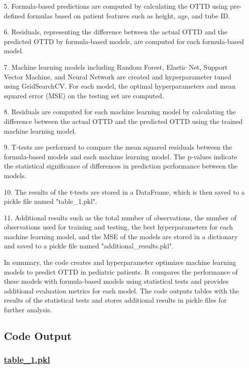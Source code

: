 \documentclass[11pt]{article}
\begin{document}
5. Formula-based predictions are computed by calculating the OTTD using pre-defined formulas based on patient features such as height, age, and tube ID.

6. Residuals, representing the difference between the actual OTTD and the predicted OTTD by formula-based models, are computed for each formula-based model.

7. Machine learning models including Random Forest, Elastic Net, Support Vector Machine, and Neural Network are created and hyperparameter tuned using GridSearchCV. For each model, the optimal hyperparameters and mean squared error (MSE) on the testing set are computed.

8. Residuals are computed for each machine learning model by calculating the difference between the actual OTTD and the predicted OTTD using the trained machine learning model.

9. T-tests are performed to compare the mean squared residuals between the formula-based models and each machine learning model. The p-values indicate the statistical significance of differences in prediction performance between the models.

10. The results of the t-tests are stored in a DataFrame, which is then saved to a pickle file named "table\_1.pkl".

11. Additional results such as the total number of observations, the number of observations used for training and testing, the best hyperparameters for each machine learning model, and the MSE of the models are stored in a dictionary and saved to a pickle file named "additional\_results.pkl".

In summary, the code creates and hyperparameter optimizes machine learning models to predict OTTD in pediatric patients. It compares the performance of these models with formula-based models using statistical tests and provides additional evaluation metrics for each model. The code outputs tables with the results of the statistical tests and stores additional results in pickle files for further analysis.

\subsection{Code Output}\hypertarget{file-table-1-pkl}{}

\subsubsection*{\hyperlink{code-Data Analysis-table-1-pkl}{table\_1.pkl}}
\end{document}
